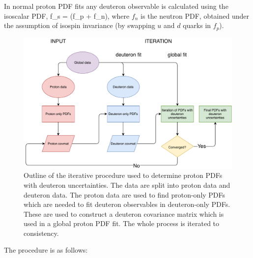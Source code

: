 In normal proton PDF fits any deuteron observable is calculated using the isoscalar PDF, 
\be
\label{eqn:iso}
f_s =  (f_p + f_n),
\ee
where $f_n$ is the neutron PDF, obtained under the assumption of isospin invariance (by swapping $u$ and $d$ quarks in $f_p$).
\begin{figure}[h]
  \begin{center}
    \includegraphics[width=\linewidth]{nuclear/plots/deut_flowchart.pdf}
   \caption{ Outline of the iterative procedure used to determine proton PDFs with deuteron uncertainties. The data are split into proton data and deuteron data. The proton data are used to find proton-only PDFs which are needed to fit deuteron observables in deuteron-only PDFs. These are used to construct a deuteron covariance matrix which is used in a global proton PDF fit. The whole process is iterated to consistency.
    \label{fig:flowchart} }
  \end{center}
\end{figure}
The procedure is as follows:
